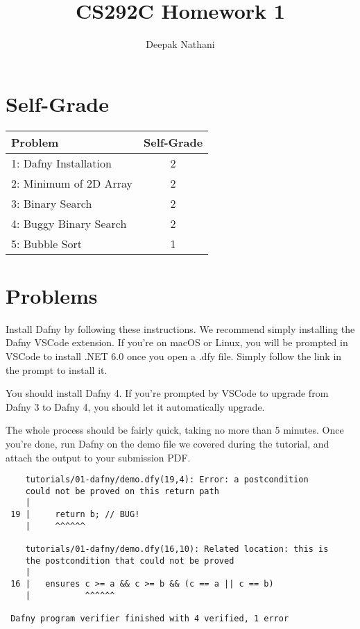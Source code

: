 \documentclass{jhwhw}
\author{Deepak Nathani}
\title{CS292C Homework 1}
\begin{document}
\maketitle

\section{Self-Grade}

\begin{table}[h]
    \centering
    \begin{tabular}{l|c}
        \toprule
        \midrule
        \textbf{Problem} & \textbf{Self-Grade} \\
        \midrule
        {1: Dafny Installation} & {2} \\
        \midrule
        {2: Minimum of 2D Array} & {2} \\
        \midrule
        {3: Binary Search} & {2} \\
        \midrule
        {4: Buggy Binary Search} & {2} \\
        \midrule
        {5: Bubble Sort} & {1} \\
        \midrule
        \bottomrule
    \end{tabular}
\end{table}

\section{Problems}
Install Dafny by following these instructions. We recommend simply installing the Dafny VSCode extension. If you're on macOS or Linux, you will be prompted in VSCode to install .NET 6.0 once you open a .dfy file. Simply follow the link in the prompt to install it.


You should install Dafny 4. If you're prompted by VSCode to upgrade from Dafny 3 to Dafny 4, you should let it automatically upgrade.


The whole process should be fairly quick, taking no more than 5 minutes.
Once you're done, run Dafny on the demo file we covered during the tutorial, and attach the output to your submission PDF.

\solution

\begin{lstlisting}
    tutorials/01-dafny/demo.dfy(19,4): Error: a postcondition 
    could not be proved on this return path
    |
 19 |     return b; // BUG!
    |     ^^^^^^
 
    tutorials/01-dafny/demo.dfy(16,10): Related location: this is
    the postcondition that could not be proved
    |
 16 |   ensures c >= a && c >= b && (c == a || c == b)
    |           ^^^^^^
 
 Dafny program verifier finished with 4 verified, 1 error
\end{lstlisting}
\end{document}
